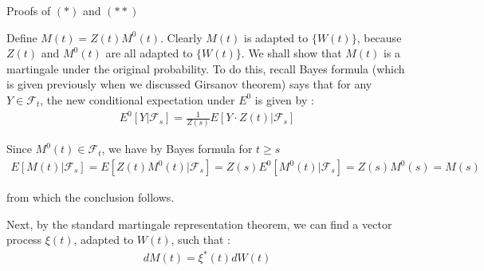 \documentclass{beamer}
\begin{document}
\begin{frame}{Proofs of $(*)$ and $(**)$}

    {\footnotesize \footnotesize
   
    \par Define $M(t) = Z(t) M^0(t)$. Clearly \(M(t)\) is adapted to \(\{W(t)\}\), because \(Z(t)\) and \(M^0(t)\) are 
    all adapted to \(\{W(t)\}\). We shall show that \(M(t)\) is a martingale under the original probability. To do this, recall Bayes formula (which is given previously when we discussed Girsanov theorem) 
    says that for any \( Y \in \mathcal{F}_t \), the new conditional expectation under \( E^0 \) is given by  :
    \begin{align*}
        E^0 [Y | \mathcal{F}_s] = \frac{1}{Z(s)} E[Y \cdot Z(t) | \mathcal{F}_s]
    \end{align*}
    \par Since \( M^0(t) \in \mathcal{F}_t \), we have by Bayes formula for \( t \geq s \)  
    \begin{align*}
        E[M(t) | \mathcal{F}_s] = E[Z(t)M^0(t) | \mathcal{F}_s] = Z(s)E^0[M^0(t) | \mathcal{F}_s] = Z(s)M^0(s) = M(s)
    \end{align*}
    \par from which the conclusion follows.  
    \par Next, by the standard martingale representation theorem, we can find a vector process \( \xi(t) \), adapted to \( W(t) \), such that :
    \begin{align*}
        dM(t) = \xi^*(t) dW(t)
    \end{align*}
   
    }

\end{frame}
\end{document}
